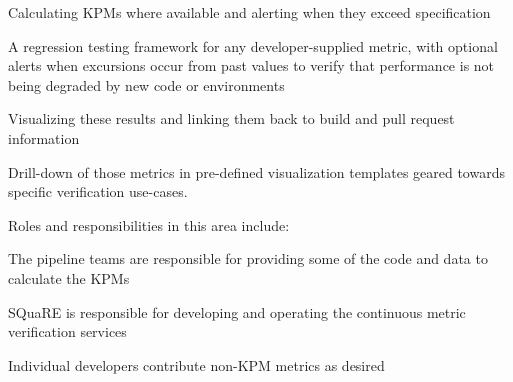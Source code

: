 \begin{itemize_single}

\item Calculating KPMs where available and alerting when they exceed specification

\item A regression testing framework for any developer-supplied metric, with optional alerts when excursions occur from past values to verify that performance is not being degraded by new code or environments

\item Visualizing these results and linking them back to build and pull request information

\item  Drill-down of those metrics in pre-defined visualization templates geared towards specific verification use-cases.

Roles and responsibilities in this area include:

\item The pipeline teams  are responsible for providing some of the code and data to calculate the KPMs

\item SQuaRE is responsible for developing and operating the continuous metric verification services

\item Individual developers contribute non-KPM metrics as desired

\end{itemize_single}
